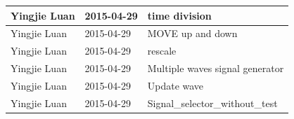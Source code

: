 \documentclass[11pt]{scrartcl}
\begin{document}
\begin{longtable}{@{\extracolsep{\fill}}lll@{}}
Yingjie Luan & 2015-04-29 & time division \\ \hline
Yingjie Luan & 2015-04-29 & MOVE up and down \\ \hline
Yingjie Luan & 2015-04-29 & rescale \\ \hline
Yingjie Luan & 2015-04-29 & Multiple waves signal generator \\ \hline
Yingjie Luan & 2015-04-29 & Update wave \\ \hline
Yingjie Luan & 2015-04-29 & Signal\_selector\_without\_test \\ \hline\end{longtable}





 
\end{document}
